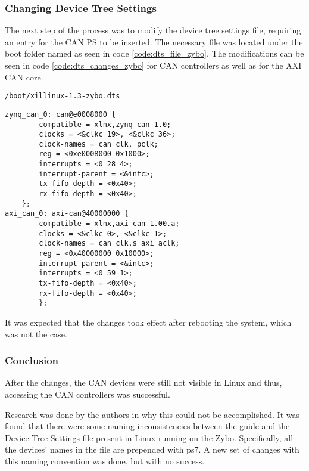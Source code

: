 \subsubsection*{Changing Device Tree Settings}
The next step of the process was to modify the device tree settings file, requiring an entry for the CAN PS to be inserted.
The necessary file was located under the boot folder named as seen in code \ref{code:dts_file_zybo}.
The modifications can be seen in code \ref{code:dts_changes_zybo} for CAN controllers as well as for the AXI CAN core.

\begin{lstlisting}[numbers=none,caption={Device tree settings file and its path.},label={code:dts_file_zybo}]
/boot/xillinux-1.3-zybo.dts
\end{lstlisting}
\begin{lstlisting}[caption={Device tree settings changes.},label={code:dts_changes_zybo}]
zynq_can_0: can@e0008000 {
        compatible = xlnx,zynq-can-1.0;
        clocks = <&clkc 19>, <&clkc 36>;
        clock-names = can_clk, pclk;
        reg = <0xe0008000 0x1000>;
        interrupts = <0 28 4>;
        interrupt-parent = <&intc>;
        tx-fifo-depth = <0x40>;
        rx-fifo-depth = <0x40>;
    };
axi_can_0: axi-can@40000000 {
        compatible = xlnx,axi-can-1.00.a;
        clocks = <&clkc 0>, <&clkc 1>;
        clock-names = can_clk,s_axi_aclk;
        reg = <0x40000000 0x10000>;
        interrupt-parent = <&intc>;
        interrupts = <0 59 1>;
        tx-fifo-depth = <0x40>;
        rx-fifo-depth = <0x40>;
        };
\end{lstlisting}
It was expected that the changes took effect after rebooting the system, which was not the case.

\subsubsection*{Conclusion}
After the changes, the CAN devices were still not visible in Linux and thus, accessing the CAN controllers was successful.

Research was done by the authors in why this could not be accomplished.
It was found that there were some naming inconsistencies between the guide and the Device Tree Settings file present in Linux running on the Zybo. Specifically, all the devices' names in the file are prepended with ps7.
A new set of changes with this naming convention was done, but with no success.\\

